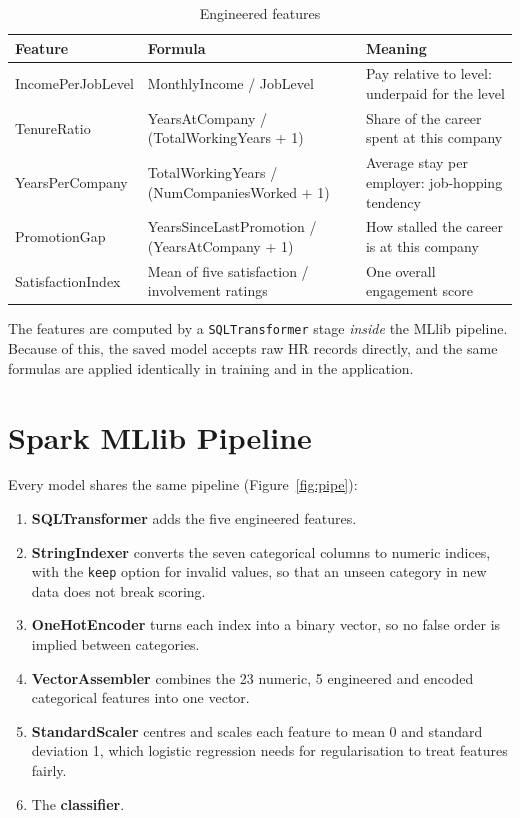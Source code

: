 \documentclass[12pt,a4paper]{report}
\begin{document}
\begin{table}[H]
\centering
\caption{Engineered features}
\label{tab:fe}
\small
\begin{tabularx}{\textwidth}{|P{3.6cm}|P{5.2cm}|L|}
\hline
\textbf{Feature} & \textbf{Formula} & \textbf{Meaning} \\ \hline
IncomePerJobLevel & MonthlyIncome / JobLevel & Pay relative to level: underpaid for the level \\ \hline
TenureRatio & YearsAtCompany / (TotalWorkingYears + 1) & Share of the career spent at this company \\ \hline
YearsPerCompany & TotalWorkingYears / (NumCompaniesWorked + 1) & Average stay per employer: job-hopping tendency \\ \hline
PromotionGap & YearsSinceLastPromotion / (YearsAtCompany + 1) & How stalled the career is at this company \\ \hline
SatisfactionIndex & Mean of five satisfaction / involvement ratings & One overall engagement score \\ \hline
\end{tabularx}
\end{table}

The features are computed by a \texttt{SQLTransformer} stage \emph{inside} the MLlib pipeline. Because of this, the saved model accepts raw HR records directly, and the same formulas are applied identically in training and in the application.

\section{Spark MLlib Pipeline}

Every model shares the same pipeline (Figure~\ref{fig:pipe}):

\begin{enumerate}
\item \textbf{SQLTransformer} adds the five engineered features.
\item \textbf{StringIndexer} converts the seven categorical columns to numeric indices, with the \texttt{keep} option for invalid values, so that an unseen category in new data does not break scoring.
\item \textbf{OneHotEncoder} turns each index into a binary vector, so no false order is implied between categories.
\item \textbf{VectorAssembler} combines the 23 numeric, 5 engineered and encoded categorical features into one vector.
\item \textbf{StandardScaler} centres and scales each feature to mean 0 and standard deviation 1, which logistic regression needs for regularisation to treat features fairly.
\item The \textbf{classifier}.
\end{enumerate}
\end{document}
